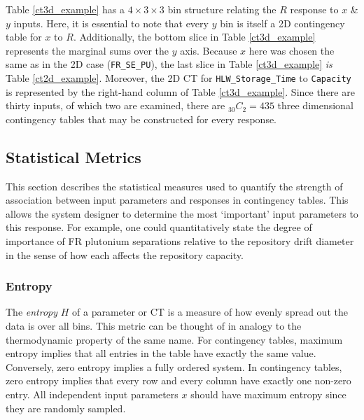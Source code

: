 

Table \ref{ct3d_example} has a $4\times 3\times 3$ bin structure relating the $R$ response 
to $x$ \& $y$ inputs.  Here, it is essential to note that every $y$ bin
is itself a 2D contingency table for $x$ to $R$.
Additionally, the bottom slice in Table \ref{ct3d_example} represents the marginal sums over 
the $y$ axis.  Because $x$ here was chosen the same as in the
2D case (\texttt{FR\_SE\_PU}), the last slice in Table \ref{ct3d_example} \emph{is} Table 
\ref{ct2d_example}.  Moreover, the 2D CT for \texttt{HLW\_Storage\_Time}
to \texttt{Capacity} is represented by the right-hand column of Table \ref{ct3d_example}.
Since there are thirty inputs, of which two are examined, there are $_{30}C_2 = 435$ three 
dimensional contingency tables that may be constructed for every response.


\subsection{Statistical Metrics}
\label{cts_sec:statistical_metrics}

This section describes the statistical measures used to quantify the strength of association 
between input parameters and responses in contingency tables.
This allows the system designer to determine the most `important' input parameters to this response.  
For example, one
could quantitatively state the degree of importance of FR plutonium separations relative to the repository drift 
diameter in the sense of how each affects the repository capacity.

\subsubsection{Entropy}
\label{cts_sec:entropy}

The \emph{entropy} $H$ of a parameter or CT is a measure of how evenly spread out the data is over all 
bins.  This metric can be thought of
in analogy to the thermodynamic property of the same name.  For contingency tables,
maximum entropy implies that all entries in the table have exactly the same value.
Conversely, zero entropy implies a fully ordered system.  In contingency tables, zero entropy implies 
that every row and every column have exactly one
non-zero entry.  All independent input parameters $x$ should have maximum entropy since they are 
randomly sampled.

